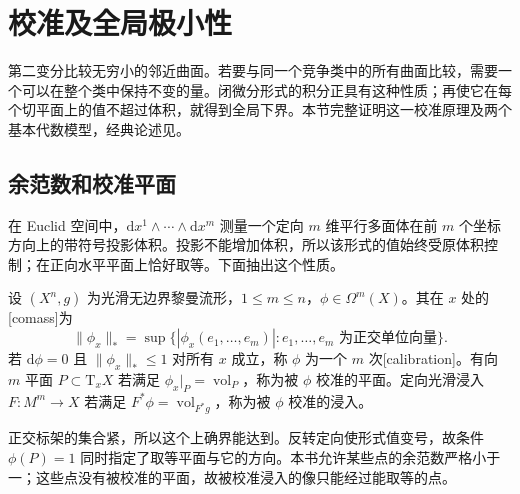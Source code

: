 
% 
% 
% 

\section{校准及全局极小性}
\label{g3:sec:1904}

第二变分比较无穷小的邻近曲面。若要与同一个竞争类中的所有曲面比较，需要一个可以在整个类中保持不变的量。闭微分形式的积分正具有这种性质；再使它在每个切平面上的值不超过体积，就得到全局下界。本节完整证明这一校准原理及两个基本代数模型，经典论述见\cite[第II.4节，第59页，定理4.2；第III.1--III.2节，第86--93页]{HarveyLawson1982Calibrated}。

\subsection{余范数和校准平面}
\label{g3:subsec:1904:01}
在 Euclid 空间中，\(\mathrm dx^1\wedge\cdots\wedge\mathrm dx^m\) 测量一个定向 \(m\) 维平行多面体在前 \(m\) 个坐标方向上的带符号投影体积。投影不能增加体积，所以该形式的值始终受原体积控制；在正向水平平面上恰好取等。下面抽出这个性质。

\begin{definition}\label{g3:def:calibration-comass}
	设 \((X^n,g)\) 为光滑无边界黎曼流形，\(1\le m\le n\)，\(\phi\in\Omega^m(X)\)。其在 \(x\) 处的[comass]为
	\[
		\|\phi_x\|_*=\sup\{|\phi_x(e_1,\ldots,e_m)|:
		 e_1,\ldots,e_m\text{ 为正交单位向量}\}.
	\]
	若 \(\mathrm d\phi=0\) 且 \(\|\phi_x\|_*\le1\) 对所有 \(x\) 成立，称 \(\phi\) 为一个 \(m\) 次[calibration]。有向 \(m\) 平面 \(P\subset\mathrm T_xX\) 若满足 \(\phi_x|_P=\operatorname{vol}_P\)，称为被 \(\phi\) 校准的平面。定向光滑浸入 \(F:M^m\to X\) 若满足 \(F^*\phi=\operatorname{vol}_{F^*g}\)，称为被 \(\phi\) 校准的浸入。
\end{definition}

正交标架的集合紧，所以这个上确界能达到。反转定向使形式值变号，故条件 \(\phi(P)=1\) 同时指定了取等平面与它的方向。本书允许某些点的余范数严格小于一；这些点没有被校准的平面，故被校准浸入的像只能经过能取等的点。

\ProseParagraphBreak

